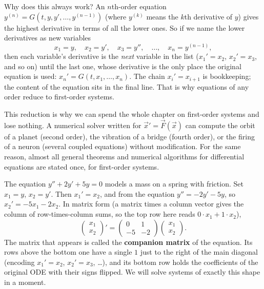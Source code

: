 \begin{whybox}
Why does this always work? An $n$th-order equation
$y^{(n)} = G(t, y, y', \dots, y^{(n-1)})$ (where $y^{(k)}$ means the $k$th
derivative of $y$) gives the highest derivative in terms of
all the lower ones. So if we name the lower derivatives as new variables
\[
  x_1 = y,\quad x_2 = y',\quad x_3 = y'',\quad \dots,\quad x_n = y^{(n-1)},
\]
then each variable's derivative is the \emph{next} variable in the
list ($x_1' = x_2$, $x_2' = x_3$, and so on) until the last one, whose
derivative is the only place the original equation is used:
$x_n' = G(t, x_1, \dots, x_n)$. The chain $x_i' = x_{i+1}$ is
bookkeeping; the content of the equation sits in the final
line. That is why equations of any order
reduce to first-order systems.
\end{whybox}

\begin{aestheticbox}
This reduction is why we can spend the whole chapter on first-order
systems and lose nothing. A numerical solver written for $\vec x' = \vec F(\vec
x)$ can compute the orbit of a planet (second order), the vibration of a
bridge (fourth order), or the firing of a neuron (several coupled equations)
without modification. For the same reason, almost all general theorems and numerical
algorithms for differential equations are stated once, for first-order systems.
\end{aestheticbox}

\begin{example}
\label{ch39:ex-damped}
The equation $y'' + 2y' + 5y = 0$ models a mass on a spring with friction. Set
$x_1 = y$, $x_2 = y'$. Then $x_1' = x_2$, and from the equation
$y'' = -2y' - 5y$, so $x_2' = -5x_1 - 2x_2$. In matrix form (a matrix times a
column vector gives the column of row-times-column sums, so the top row here
reads $0\cdot x_1 + 1\cdot x_2$),
\[
  \begin{pmatrix} x_1 \\ x_2 \end{pmatrix}'
  =
  \begin{pmatrix} 0 & 1 \\ -5 & -2 \end{pmatrix}
  \begin{pmatrix} x_1 \\ x_2 \end{pmatrix}.
\]
The matrix that appears is called the \textbf{companion matrix} of the
equation. Its rows above the bottom one have a single $1$ just to the right of
the main diagonal (encoding $x_1' = x_2$, $x_2' = x_3$, \dots), and its bottom
row holds the coefficients of the original ODE with their signs flipped. We
will solve systems of exactly this shape in a moment.
\end{example}


